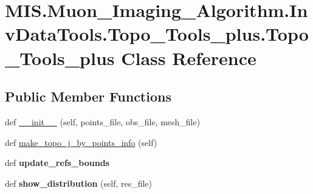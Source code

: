 \hypertarget{classMIS_1_1Muon__Imaging__Algorithm_1_1InvDataTools_1_1Topo__Tools__plus_1_1Topo__Tools__plus}{}\section{M\+I\+S.\+Muon\+\_\+\+Imaging\+\_\+\+Algorithm.\+Inv\+Data\+Tools.\+Topo\+\_\+\+Tools\+\_\+plus.\+Topo\+\_\+\+Tools\+\_\+plus Class Reference}
\label{classMIS_1_1Muon__Imaging__Algorithm_1_1InvDataTools_1_1Topo__Tools__plus_1_1Topo__Tools__plus}
\subsection*{Public Member Functions}
\begin{DoxyCompactItemize}
\item 
def \hyperlink{classMIS_1_1Muon__Imaging__Algorithm_1_1InvDataTools_1_1Topo__Tools__plus_1_1Topo__Tools__plus_a3d505df065ba0e4d1937a7609d32e7ba}{\+\_\+\+\_\+init\+\_\+\+\_\+} (self, points\+\_\+file, obs\+\_\+file, mesh\+\_\+file)
\item 
def \hyperlink{classMIS_1_1Muon__Imaging__Algorithm_1_1InvDataTools_1_1Topo__Tools__plus_1_1Topo__Tools__plus_aa580da2533e9004d6f5ddf81f44accae}{make\+\_\+topo\+\_\+j\+\_\+by\+\_\+points\+\_\+info} (self)
\item 
\mbox{\label{classMIS_1_1Muon__Imaging__Algorithm_1_1InvDataTools_1_1Topo__Tools__plus_1_1Topo__Tools__plus_a4a746cbc1b43ed5643b98c5171375eea}} 
def {\bfseries update\+\_\+refs\+\_\+bounds}
\item 
\mbox{\label{classMIS_1_1Muon__Imaging__Algorithm_1_1InvDataTools_1_1Topo__Tools__plus_1_1Topo__Tools__plus_a70978040d8ff25c8b3e028b7fdb3e50a}} 
def {\bfseries show\+\_\+distribution} (self, res\+\_\+file)
\end{DoxyCompactItemize}
